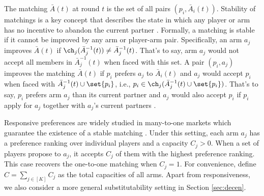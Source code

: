 The matching $\bar{A}(t)$ at round $t$ is the set of all pairs $(p_i,\bar{A}_i(t))$. 
Stability of matchings is a key concept that describes the state in which any player or arm has no incentive to abandon the current partner \citep{gale1962college,roth1992two}. 
Formally, a matching is stable if it cannot be improved by any arm or player-arm pair.
Specifically, an arm $a_j$ improves $\bar{A}(t)$ if $\ch_j( \bar{A}^{-1}_j(t)) \neq \bar{A}_j^{-1}(t)$. That's to say, arm $a_j$ would not accept all members in $\bar{A}^{-1}_j(t)$ when faced with this set. A pair $(p_i,a_j)$ improves the matching $\bar{A}(t)$ if $p_i$ prefers $a_j$ to $\bar{A}_i(t)$ and $a_j$ would accept $p_i$ when faced with $\bar{A}^{-1}_j(t)\cup \set{p_i}$, i.e., $p_i \in \ch_j( \bar{A}^{-1}_j(t)\cup \set{p_i} )$.
That's to say, $p_i$ prefers arm $a_j$ than its current partner and $a_j$ would also accept $p_i$ if $p_i$ apply for $a_j$ together with $a_j$'s current partners
\citep{kelso1982job,abdulkadirouglu2005college,roth1992two}. 




Responsive preferences are widely studied in many-to-one markets which guarantee the existence of a stable matching \citep{roth1992two,wang2022bandit}. 
Under this setting, each arm $a_j$ has a preference ranking over individual players and a capacity $C_j>0$. When a set of players propose to $a_j$, it accepts $C_j$ of them with the highest preference ranking. 
This case recovers the one-to-one matching when $C_j=1$. 
For convenience, define $C=\sum_{j\in[K]} C_j$ as the total capacities of all arms. 
Apart from responsiveness, we also consider a more general substitutability setting in Section \ref{sec:decen}. 





